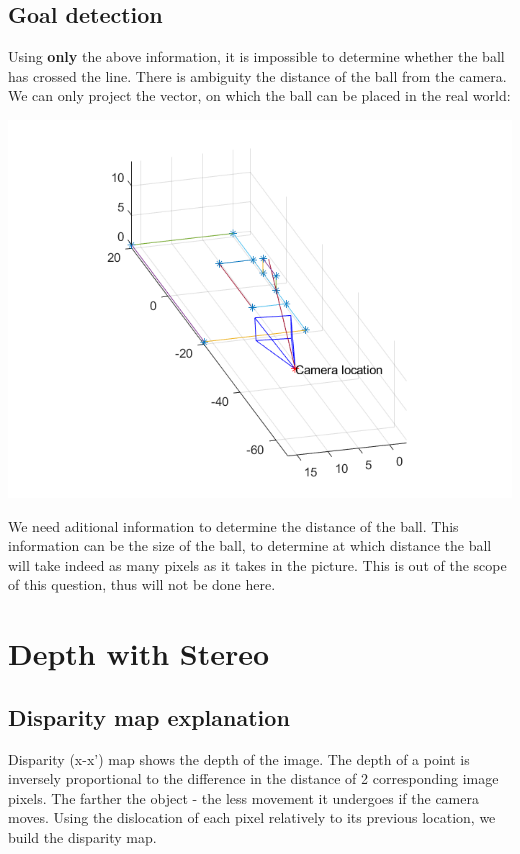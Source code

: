 \documentclass[a4paper]{iacas}
\begin{document}
\subsection{Goal detection}
Using \textbf{only} the above information, it is impossible to determine whether the ball has crossed the line. There is ambiguity the distance of the ball from the camera. We can only project the vector, on which the ball can be placed in the real world:

\vskip 0.1in
\begin{minipage}{\linewidth}
	\includegraphics[scale=0.8]{goal_res/goal_camera_frame.png}
	\label{fig_3}
\end{minipage}
\vskip 0.1in

We need aditional information to determine the distance of the ball. This information can be the size of the ball, to determine at which distance the ball will take indeed as many pixels as it takes in the picture. This is out of the scope of this question, thus will not be done here. 





\newpage
\section{Depth with Stereo}
\subsection{Disparity map explanation}
Disparity (x-x') map shows the depth of the image. The depth of a point is inversely proportional to the difference in the distance of 2 corresponding image pixels. The farther the object - the less movement it undergoes if the camera moves. Using the dislocation of each pixel relatively to its previous location, we build the disparity map. 
\end{document}
